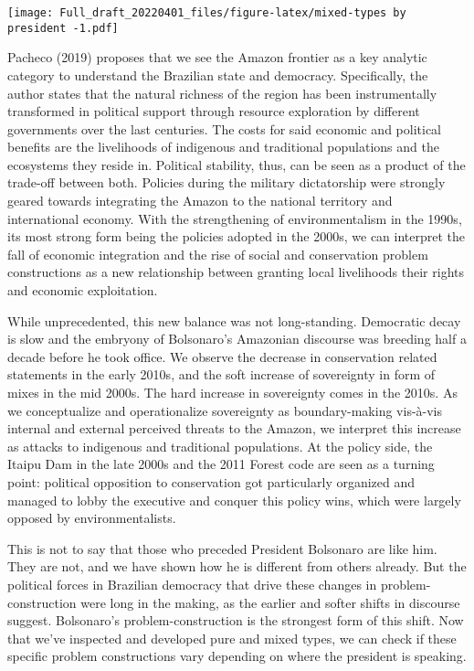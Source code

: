 \documentclass[
]{article}
\begin{document}
\texttt{[image: Full\_draft\_20220401\_files/figure-latex/mixed-types by president -1.pdf]}

Pacheco (2019) proposes that we see the Amazon frontier as a key
analytic category to understand the Brazilian state and democracy.
Specifically, the author states that the natural richness of the region
has been instrumentally transformed in political support through
resource exploration by different governments over the last centuries.
The costs for said economic and political benefits are the livelihoods
of indigenous and traditional populations and the ecosystems they reside
in. Political stability, thus, can be seen as a product of the trade-off
between both. Policies during the military dictatorship were strongly
geared towards integrating the Amazon to the national territory and
international economy. With the strengthening of environmentalism in the
1990s, its most strong form being the policies adopted in the 2000s, we
can interpret the fall of economic integration and the rise of social
and conservation problem constructions as a new relationship between
granting local livelihoods their rights and economic exploitation.

While unprecedented, this new balance was not long-standing. Democratic
decay is slow and the embryony of Bolsonaro's Amazonian discourse was
breeding half a decade before he took office. We observe the decrease in
conservation related statements in the early 2010s, and the soft
increase of sovereignty in form of mixes in the mid 2000s. The hard
increase in sovereignty comes in the 2010s. As we conceptualize and
operationalize sovereignty as boundary-making vis-à-vis internal and
external perceived threats to the Amazon, we interpret this increase as
attacks to indigenous and traditional populations. At the policy side,
the Itaipu Dam in the late 2000s and the 2011 Forest code are seen as a
turning point: political opposition to conservation got particularly
organized and managed to lobby the executive and conquer this policy
wins, which were largely opposed by environmentalists.

This is not to say that those who preceded President Bolsonaro are like
him. They are not, and we have shown how he is different from others
already. But the political forces in Brazilian democracy that drive
these changes in problem-construction were long in the making, as the
earlier and softer shifts in discourse suggest. Bolsonaro's
problem-construction is the strongest form of this shift. Now that we've
inspected and developed pure and mixed types, we can check if these
specific problem constructions vary depending on where the president is
speaking.
\end{document}

